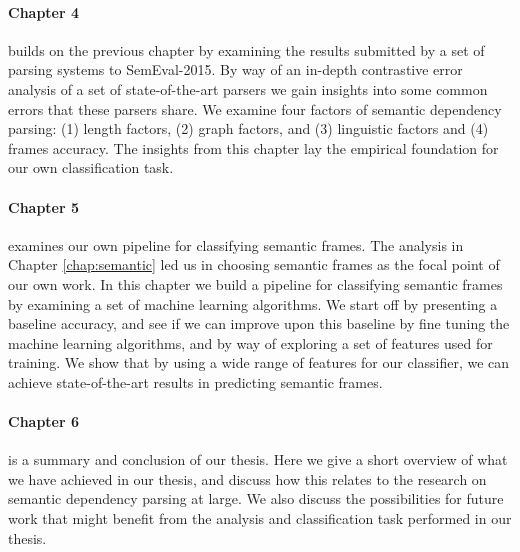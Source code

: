 \paragraph{Chapter 4} builds on the previous chapter by examining the results submitted by a set of parsing systems to SemEval-2015. By way of an in-depth contrastive error analysis of a set of state-of-the-art parsers we gain insights into some common errors that these parsers share. We examine four factors of semantic dependency parsing: (1) length factors, (2) graph factors, and (3) linguistic factors and (4) frames accuracy. The insights from this chapter lay the empirical foundation for our own classification task.

\paragraph{Chapter 5} examines our own pipeline for classifying semantic frames. The analysis in Chapter \ref{chap:semantic} led us in choosing semantic frames as the focal point of our own work. In this chapter we build a pipeline for classifying semantic frames by examining a set of machine learning algorithms. We start off by presenting a baseline accuracy, and see if we can improve upon this baseline by fine tuning the machine learning algorithms, and by way of exploring a set of features used for training. We show that by using a wide range of features for our classifier, we can achieve state-of-the-art results in predicting semantic frames.

\paragraph{Chapter 6} is a summary and conclusion of our thesis. Here we give a short overview of what we have achieved in our thesis, and discuss how this relates to the research on semantic dependency parsing at large. We also discuss the possibilities for future work that might benefit from the analysis and classification task performed in our thesis.